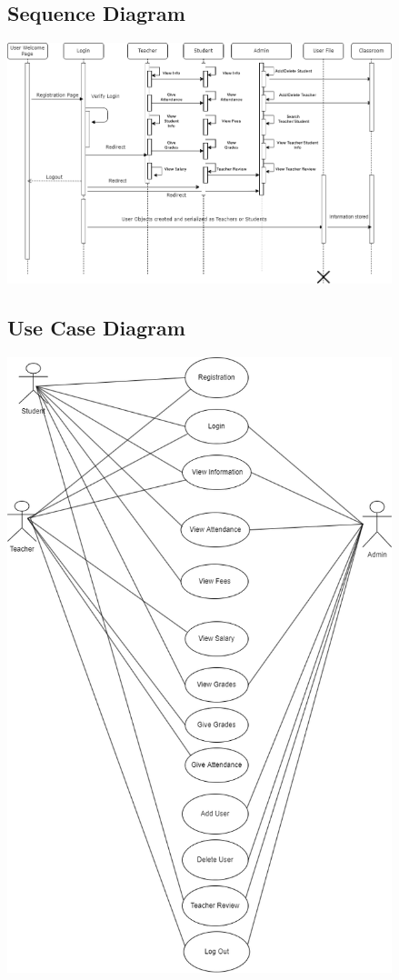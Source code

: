 \documentclass[a4paper,12pt]{article}
\begin{document}
\subsection{Sequence Diagram}
\begin{center}
\includegraphics[width=11.2cm]{8.png} 
\end{center}
\newpage

\subsection{Use Case Diagram}
\begin{center}
\includegraphics[width=11.2cm]{9.png} 
\end{center}
\newpage
\end{document}
